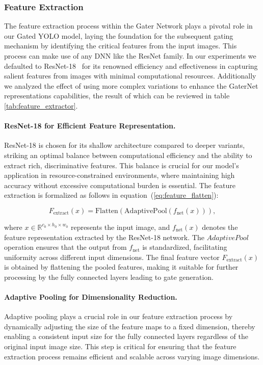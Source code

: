 \subsubsection{Feature Extraction}
The feature extraction process within the Gater Network plays a pivotal role in our Gated YOLO model, laying the foundation for the subsequent gating mechanism by identifying the critical features from the input images. This process can make use of any DNN like the ResNet family. In our experiments we defaulted to ResNet-18~\cite{he2016deep} for its renowned efficiency and effectiveness in capturing salient features from images with minimal computational resources. Additionally we analyzed the effect of using more complex variations to enhance the GaterNet representations capabilities, the result of which can be reviewed in table \ref{tab:feature_extractor}.

\paragraph{ResNet-18 for Efficient Feature Representation.} ResNet-18 is chosen for its shallow architecture compared to deeper variants, striking an optimal balance between computational efficiency and the ability to extract rich, discriminative features. This balance is crucial for our model's application in resource-constrained environments, where maintaining high accuracy without excessive computational burden is essential. The feature extraction is formalized as follows in equation~(\ref{eq:feature_flatten}):

\begin{equation}
    F_{\text{extract}}(x) = \text{Flatten}(\text{AdaptivePool}(f_{\text{net}}(x))),
    \label{eq:feature_flatten}
\end{equation}

where \(x \in \mathbb{R}^{c_0 \times h_0 \times w_0}\) represents the input image, and \(f_{\text{net}}(x)\) denotes the feature representation extracted by the ResNet-18 network. The \(AdaptivePool\) operation ensures that the output from \(f_{\text{net}}\) is standardized, facilitating uniformity across different input dimensions. The final feature vector \(F_{\text{extract}}(x)\) is obtained by flattening the pooled features, making it suitable for further processing by the fully connected layers leading to gate generation.

\paragraph{Adaptive Pooling for Dimensionality Reduction.} Adaptive pooling plays a crucial role in our feature extraction process by dynamically adjusting the size of the feature maps to a fixed dimension, thereby enabling a consistent input size for the fully connected layers regardless of the original input image size. This step is critical for ensuring that the feature extraction process remains efficient and scalable across varying image dimensions.

